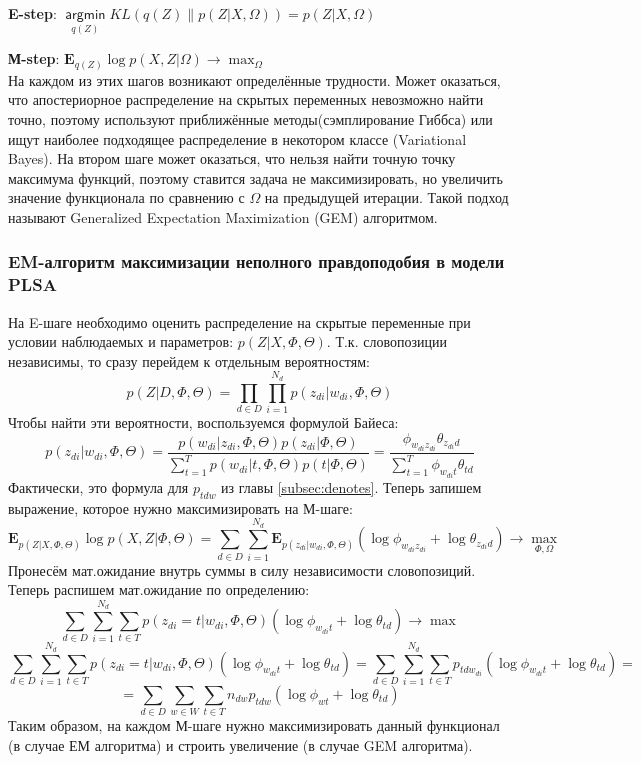 \documentclass[12pt]{article}
\newcommand{\argmin}{\mathop{\mathsf{argmin}}\limits}
\begin{document}
\textbf{E-step}: $\argmin_{q(Z)} KL(q(Z)\|p(Z|X,\Omega)) = p(Z|X, \Omega)$

\textbf{М-step}: $\mathbf{E}_{q(Z)} \log p(X, Z|\Omega) \to \max_{\Omega}$\\
На каждом из этих шагов возникают определённые трудности.  Может оказаться, что апостериорное распределение на скрытых переменных невозможно найти точно, поэтому используют приближённые методы(сэмплирование Гиббса) или ищут наиболее подходящее распределение в некотором классе (Variational Bayes). На втором шаге может оказаться, что нельзя найти точную точку максимума функций, поэтому ставится задача не максимизировать, но увеличить значение функционала по сравнению с $\Omega$ на предыдущей итерации. Такой подход называют Generalized Expectation Maximization (GEM) алгоритмом.

\subsubsection{EM-алгоритм максимизации неполного правдоподобия в модели PLSA}

 На E-шаге необходимо оценить распределение на скрытые переменные при условии наблюдаемых и параметров: $p(Z|X,\Phi,\Theta)$. Т.к. словопозиции независимы, то сразу перейдем к отдельным вероятностям:
\[
p(Z|D,\Phi, \Theta) = \prod\limits_{d \in D} \prod\limits_{i=1}^{N_d} p(z_{di}|w_{di}, \Phi, \Theta)
\]
Чтобы найти эти вероятности, воспользуемся формулой Байеса:
\[
p(z_{di}|w_{di}, \Phi, \Theta) = \frac{p(w_{di}|z_{di}, \Phi, \Theta)p(z_{di}|\Phi,\Theta)}{\sum_{t=1}^T p(w_{di}|t, \Phi, \Theta)p(t|\Phi,\Theta)}
= \frac{\phi_{w_{di} z_{di}} \theta_{z_{di} d}}{\sum_{t=1}^T \phi_{w_{di}t} \theta_{td}}
\]
Фактически, это формула для $p_{tdw}$ из главы \ref{subsec:denotes}. Теперь запишем выражение, которое нужно максимизировать на М-шаге:
\[
\mathbf{E}_{p(Z|X,\Phi, \Theta)} \log p(X,Z|\Phi,\Theta) = \sum_{d \in D} \sum_{i=1}^{N_d} \mathbf{E}_{p(z_{di}|w_{di}, \Phi, \Theta)} (\log \phi_{w_{di} z_{di}} + \log \theta_{z_{di} d}) \to \max\limits_{\Phi, \Omega}
\]
Пронесём мат.ожидание внутрь суммы в силу независимости словопозиций. Теперь распишем мат.ожидание по определению:
\[
\sum_{d\in D}\sum_{i=1}^{N_d} \sum_{t \in T} p(z_{di}=t|w_{di},\Phi,\Theta) (\log \phi_{w_{di} t} + \log \theta_{td}) \to \max
\]
\[
\sum_{d\in D}\sum_{i=1}^{N_d} \sum_{t \in T} p(z_{di}=t|w_{di},\Phi,\Theta) (\log \phi_{w_{di} t} + \log \theta_{td}) =
\sum_{d\in D}\sum_{i=1}^{N_d} \sum_{t \in T} p_{tdw_{di}} (\log \phi_{w_{di} t} + \log \theta_{td}) =
\]
\[
=
\sum_{d\in D}\sum_{w \in W} \sum_{t \in T} n_{dw} p_{tdw} (\log \phi_{wt} + \log \theta_{td}) 
\]
Таким образом, на каждом М-шаге нужно максимизировать данный функционал (в случае ЕМ алгоритма) и строить увеличение (в случае GEM алгоритма).
\end{document}
